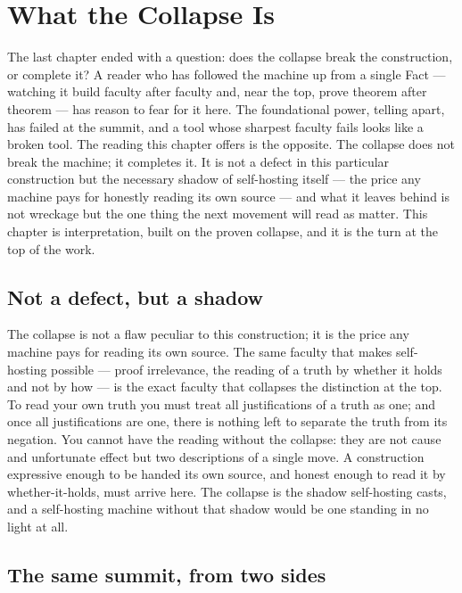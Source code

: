 \chapter{What the Collapse Is}
\label{chap:what-the-collapse-is}

The last chapter ended with a question: does the collapse break the construction, or complete it? A reader
who has followed the machine up from a single Fact --- watching it build faculty after faculty and, near
the top, prove theorem after theorem --- has reason to fear for it here. The foundational power, telling
apart, has failed at the summit, and a tool whose sharpest faculty fails looks like a broken tool. The
reading this chapter offers is the opposite. The collapse does not break the machine; it completes it. It
is not a defect in this particular construction but the necessary shadow of self-hosting itself --- the
price any machine pays for honestly reading its own source --- and what it leaves behind is not wreckage
but the one thing the next movement will read as matter. This chapter is interpretation, built on the
proven collapse, and it is the turn at the top of the work.

\section{Not a defect, but a shadow}
\label{se:not-a-defect}

The collapse is not a flaw peculiar to this construction; it is the price any machine pays for reading its
own source. The same faculty that makes self-hosting possible --- proof irrelevance, the reading of a truth
by whether it holds and not by how --- is the exact faculty that collapses the distinction at the top. To
read your own truth you must treat all justifications of a truth as one; and once all justifications are
one, there is nothing left to separate the truth from its negation. You cannot have the reading without the
collapse: they are not cause and unfortunate effect but two descriptions of a single move. A construction
expressive enough to be handed its own source, and honest enough to read it by whether-it-holds, must
arrive here. The collapse is the shadow self-hosting casts, and a self-hosting machine without that shadow
would be one standing in no light at all.

\section{The same summit, from two sides}
\label{se:same-summit-two-sides}

